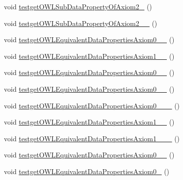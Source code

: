 \begin{DoxyCompactItemize}
\item 
void \hyperlink{classorg_1_1semanticweb_1_1owlapi_1_1api_1_1test_1_1_null_check_test_case_ad4280e28cf24165a2445b419d1f5b40c}{testget\-O\-W\-L\-Sub\-Data\-Property\-Of\-Axiom2\-\_} ()
\item 
void \hyperlink{classorg_1_1semanticweb_1_1owlapi_1_1api_1_1test_1_1_null_check_test_case_a518324866b661064085bb633f3e26f5a}{testget\-O\-W\-L\-Sub\-Data\-Property\-Of\-Axiom2\-\_\-\_} ()
\item 
void \hyperlink{classorg_1_1semanticweb_1_1owlapi_1_1api_1_1test_1_1_null_check_test_case_a3779056d3ce2e618c809ed419944494c}{testget\-O\-W\-L\-Equivalent\-Data\-Properties\-Axiom0\-\_\-\_} ()
\item 
void \hyperlink{classorg_1_1semanticweb_1_1owlapi_1_1api_1_1test_1_1_null_check_test_case_af30b02e1ee1ab8e38c028474eee48b1c}{testget\-O\-W\-L\-Equivalent\-Data\-Properties\-Axiom1\-\_\-\_} ()
\item 
void \hyperlink{classorg_1_1semanticweb_1_1owlapi_1_1api_1_1test_1_1_null_check_test_case_a800b086661de7df7926d78d44a350ed9}{testget\-O\-W\-L\-Equivalent\-Data\-Properties\-Axiom0\-\_\-\_} ()
\item 
void \hyperlink{classorg_1_1semanticweb_1_1owlapi_1_1api_1_1test_1_1_null_check_test_case_a499729a4d02b633ce2b0aa1e3ce7cb38}{testget\-O\-W\-L\-Equivalent\-Data\-Properties\-Axiom0\-\_\-\_} ()
\item 
void \hyperlink{classorg_1_1semanticweb_1_1owlapi_1_1api_1_1test_1_1_null_check_test_case_a8b5e739319b06e6097579a66728292a9}{testget\-O\-W\-L\-Equivalent\-Data\-Properties\-Axiom0\-\_\-\_\-\_} ()
\item 
void \hyperlink{classorg_1_1semanticweb_1_1owlapi_1_1api_1_1test_1_1_null_check_test_case_a2eafb8653e47575dd0df6f3b8076eaf1}{testget\-O\-W\-L\-Equivalent\-Data\-Properties\-Axiom1\-\_\-\_} ()
\item 
void \hyperlink{classorg_1_1semanticweb_1_1owlapi_1_1api_1_1test_1_1_null_check_test_case_ab08b8ac62400d1a3604a10895899a2dd}{testget\-O\-W\-L\-Equivalent\-Data\-Properties\-Axiom1\-\_\-\_\-\_} ()
\item 
void \hyperlink{classorg_1_1semanticweb_1_1owlapi_1_1api_1_1test_1_1_null_check_test_case_a58b9f73a69c24e9ae3351af3c1fe1210}{testget\-O\-W\-L\-Equivalent\-Data\-Properties\-Axiom0\-\_\-\_} ()
\item 
void \hyperlink{classorg_1_1semanticweb_1_1owlapi_1_1api_1_1test_1_1_null_check_test_case_ad36c021296c49b78ada362e1cd83b05b}{testget\-O\-W\-L\-Equivalent\-Data\-Properties\-Axiom0\-\_} ()

\end{DoxyCompactItemize}
